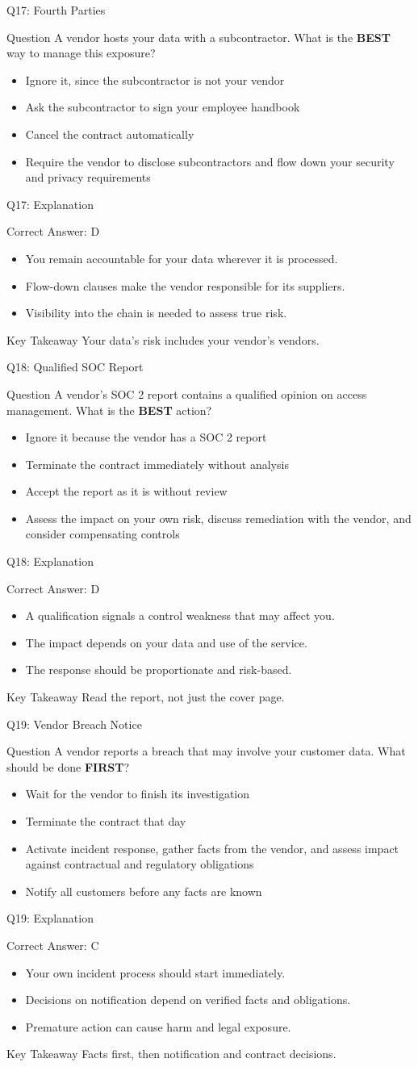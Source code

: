 \documentclass[aspectratio=169]{beamer}
\newcommand{\hq}[7]{%
	\begin{frame}{Q#1: #2}
		\begin{block}{Question}
			#3
		\end{block}
		\begin{itemize}
			#4
		\end{itemize}
	\end{frame}
	\begin{frame}{Q#1: Explanation}
		\begin{block}{Correct Answer: #5}
			\begin{itemize}
				#6
			\end{itemize}
		\end{block}
		\begin{alertblock}{Key Takeaway}
			#7
		\end{alertblock}
	\end{frame}
}
\begin{document}
	\hq{17}{Fourth Parties}
	{A vendor hosts your data with a subcontractor. What is the \textbf{BEST} way to manage this exposure?}
	{\item[\textbf{(A)}] Ignore it, since the subcontractor is not your vendor
		\item[\textbf{(B)}] Ask the subcontractor to sign your employee handbook
		\item[\textbf{(C)}] Cancel the contract automatically
		\item[\textbf{(D)}] Require the vendor to disclose subcontractors and flow down your security and privacy requirements}
	{D}
	{\item You remain accountable for your data wherever it is processed.
		\item Flow-down clauses make the vendor responsible for its suppliers.
		\item Visibility into the chain is needed to assess true risk.}
	{Your data's risk includes your vendor's vendors.}
	
	\hq{18}{Qualified SOC Report}
	{A vendor's SOC 2 report contains a qualified opinion on access management. What is the \textbf{BEST} action?}
	{\item[\textbf{(A)}] Ignore it because the vendor has a SOC 2 report
		\item[\textbf{(B)}] Terminate the contract immediately without analysis
		\item[\textbf{(C)}] Accept the report as it is without review
		\item[\textbf{(D)}] Assess the impact on your own risk, discuss remediation with the vendor, and consider compensating controls}
	{D}
	{\item A qualification signals a control weakness that may affect you.
		\item The impact depends on your data and use of the service.
		\item The response should be proportionate and risk-based.}
	{Read the report, not just the cover page.}
	
	\hq{19}{Vendor Breach Notice}
	{A vendor reports a breach that may involve your customer data. What should be done \textbf{FIRST}?}
	{\item[\textbf{(A)}] Wait for the vendor to finish its investigation
		\item[\textbf{(B)}] Terminate the contract that day
		\item[\textbf{(C)}] Activate incident response, gather facts from the vendor, and assess impact against contractual and regulatory obligations
		\item[\textbf{(D)}] Notify all customers before any facts are known}
	{C}
	{\item Your own incident process should start immediately.
		\item Decisions on notification depend on verified facts and obligations.
		\item Premature action can cause harm and legal exposure.}
	{Facts first, then notification and contract decisions.}
	
\end{document}
